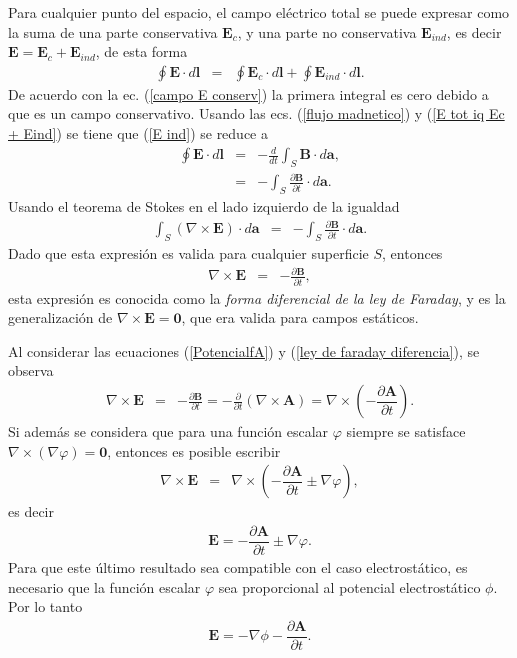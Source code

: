 \documentclass[11pt,fleqn]{book} %
\begin{document}
Para cualquier punto del espacio, el campo el\'ectrico total se puede expresar como la suma de una parte conservativa $\textbf{E}_c$, y una parte no conservativa $\textbf{E}_{ind}$, es decir $\textbf{E}=\textbf{E}_c+\textbf{E}_{ind}$, de esta forma
\begin{eqnarray}
\oint\textbf{E}\cdot d\textbf{l}&=&\oint\textbf{E}_{c}\cdot d\textbf{l}+\oint\textbf{E}_{ind}\cdot d\textbf{l}.\label{E tot iq Ec + Eind}
\end{eqnarray}
De acuerdo con la ec. (\ref{campo E conserv}) la primera integral es cero debido a que es un campo conservativo. Usando las ecs. (\ref{flujo madnetico}) y (\ref{E tot iq Ec + Eind}) se tiene que (\ref{E ind}) se reduce a
\begin{eqnarray}
\oint\textbf{E}\cdot d\textbf{l}&=&-\frac{d}{dt}\int_S\textbf{B}\cdot d\textbf{a},\nonumber\\
&=&-\int_S\frac{\partial\textbf{B}}{\partial t}\cdot d\textbf{a}.\label{e to iq m part B}
\end{eqnarray}
Usando el teorema de Stokes en el lado izquierdo de la igualdad
\begin{eqnarray}
\int_S(\nabla\times\textbf{E})\cdot d\textbf{a}&=&-\int_S\frac{\partial\textbf{B}}{\partial t}\cdot d\textbf{a}.
\end{eqnarray}
Dado que esta expresi\'on es valida para cualquier superficie $S$, entonces
\begin{eqnarray}
\nabla\times\textbf{E}&=&-\frac{\partial\textbf{B}}{\partial t},\label{ley de faraday diferencia}
\end{eqnarray}
esta expresi\'on es conocida como la \emph{forma diferencial de la ley de Faraday}, y es la generalizaci\'on de $\nabla\times \textbf{E}=\textbf{0}$, que era valida para campos est\'aticos.
\begin{obs}
Al considerar las ecuaciones  (\ref{PotencialfA}) y  (\ref{ley de faraday diferencia}), se observa
\begin{eqnarray}
\nabla\times\textbf{E}&=&-\frac{\partial\textbf{B}}{\partial t}=-\frac{\partial}{\partial t}(\nabla\times\textbf{A})=\nabla\times\left(-\dfrac{\partial \textbf{A}}{\partial t}\right).
\end{eqnarray}
Si adem\'as se considera que para una funci\'on escalar $\varphi$ siempre se satisface $\nabla\times (\nabla\varphi)=\mathbf{0}$, entonces
es posible escribir
\begin{eqnarray}
\nabla\times\textbf{E}&=&\nabla\times\left(-\dfrac{\partial \textbf{A}}{\partial t}\pm\nabla\varphi\right),
\end{eqnarray}
es decir
\begin{eqnarray*}
\textbf{E}=-\dfrac{\partial \textbf{A}}{\partial t}\pm\nabla\varphi.
\end{eqnarray*}
Para que este \'ultimo resultado sea compatible con el caso electrost\'atico, es necesario que la funci\'on escalar $\varphi$ sea proporcional al potencial electrost\'atico $\phi$. Por lo tanto
\begin{eqnarray}
\textbf{E}=-\nabla\phi-\dfrac{\partial \textbf{A}}{\partial t}.\label{EPhiA}
\end{eqnarray}
\end{obs}
\end{document}
